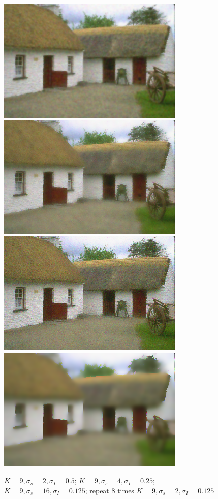 \documentclass{article}
\begin{document}
\begin{figure}[h!]
  \centering
  	\includegraphics[height=16em]{code/outputs/prob4_1_a.png}
	\includegraphics[height=16em]{code/outputs/prob4_1_b.png}
	\includegraphics[height=16em]{code/outputs/prob4_1_c.png}
	 \includegraphics[height=16em]{code/outputs/prob4_1_rep.png}
  \caption{ $K=9, \sigma_s = 2,\sigma_I = 0.5$; $K=9, \sigma_s = 4,\sigma_I = 0.25$; 
  $K=9, \sigma_s = 16,\sigma_I = 0.125$;  repeat 8 times $K=9, \sigma_s = 2,\sigma_I = 0.125$}
\end{figure}
\end{document}
